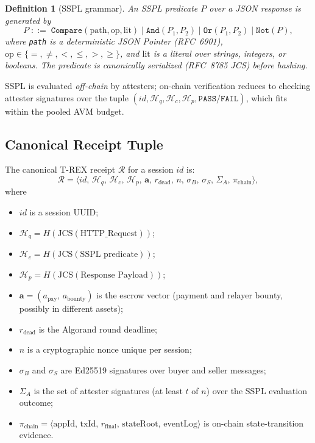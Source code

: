 \documentclass[journal]{IEEEtran}
\newtheorem{definition}[theorem]{Definition}
\newcommand{\set}[1]{\mathcal{#1}}
\begin{document}
\begin{definition}[SSPL grammar]
\label{def:sspl}
An SSPL predicate $P$ over a JSON response is generated by
\[
P \;::=\; \texttt{Compare}(\text{path}, \text{op}, \text{lit})
      \mid \texttt{And}(P_1, P_2)
      \mid \texttt{Or}(P_1, P_2)
      \mid \texttt{Not}(P),
\]
where \texttt{path} is a deterministic JSON Pointer (RFC~6901), $\text{op} \in \{=, \ne, <, \le, >, \ge\}$, and $\text{lit}$ is a literal over strings, integers, or booleans. The predicate is canonically serialized (RFC~8785 JCS) before hashing.
\end{definition}

SSPL is evaluated \emph{off-chain} by attesters; on-chain verification reduces to checking attester signatures over the tuple $(id, \set{H}_q, \set{H}_c, \set{H}_p, \texttt{PASS/FAIL})$, which fits within the pooled AVM budget.

\subsection{Canonical Receipt Tuple}
The canonical T-REX receipt $\set{R}$ for a session $id$ is:
\begin{equation}
\set{R} = \langle
id,\, \set{H}_q,\, \set{H}_c,\, \set{H}_p,\, \mathbf{a},\,
r_{\text{dead}},\, n,\,
\sigma_B,\, \sigma_S,\, \Sigma_A,\, \pi_{\text{chain}}
\rangle,
\label{eq:receipt}
\end{equation}
where
\begin{itemize}[leftmargin=*]
    \item $id$ is a session UUID;
    \item $\set{H}_q = H(\text{JCS}(\text{HTTP\_Request}))$;
    \item $\set{H}_c = H(\text{JCS}(\text{SSPL predicate}))$;
    \item $\set{H}_p = H(\text{JCS}(\text{Response Payload}))$;
    \item $\mathbf{a} = (a_{\text{pay}},\, a_{\text{bounty}})$ is the escrow vector (payment and relayer bounty, possibly in different assets);
    \item $r_{\text{dead}}$ is the Algorand round deadline;
    \item $n$ is a cryptographic nonce unique per session;
    \item $\sigma_B$ and $\sigma_S$ are Ed25519 signatures over buyer and seller messages;
    \item $\Sigma_A$ is the set of attester signatures (at least $t$ of $n$) over the SSPL evaluation outcome;
    \item $\pi_{\text{chain}} = \langle \text{appId},\, \text{txId},\, r_{\text{final}},\, \text{stateRoot},\, \text{eventLog} \rangle$ is on-chain state-transition evidence.
\end{itemize}
\end{document}
